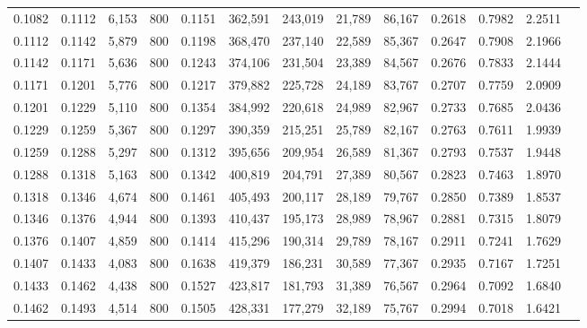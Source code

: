 \begin{tabular}{rrrrrrrrrrrrr}
0.1082 & 0.1112 &  6,153 &   800 &                                     0.1151 & 362,591 & 243,019 &  21,789 &  86,167 & 0.2618 & 0.7982 & 2.2511 \\
0.1112 & 0.1142 &  5,879 &   800 &                                     0.1198 & 368,470 & 237,140 &  22,589 &  85,367 & 0.2647 & 0.7908 & 2.1966 \\
0.1142 & 0.1171 &  5,636 &   800 &                                     0.1243 & 374,106 & 231,504 &  23,389 &  84,567 & 0.2676 & 0.7833 & 2.1444 \\
0.1171 & 0.1201 &  5,776 &   800 &                                     0.1217 & 379,882 & 225,728 &  24,189 &  83,767 & 0.2707 & 0.7759 & 2.0909 \\
0.1201 & 0.1229 &  5,110 &   800 &                                     0.1354 & 384,992 & 220,618 &  24,989 &  82,967 & 0.2733 & 0.7685 & 2.0436 \\
0.1229 & 0.1259 &  5,367 &   800 &                                     0.1297 & 390,359 & 215,251 &  25,789 &  82,167 & 0.2763 & 0.7611 & 1.9939 \\
0.1259 & 0.1288 &  5,297 &   800 &                                     0.1312 & 395,656 & 209,954 &  26,589 &  81,367 & 0.2793 & 0.7537 & 1.9448 \\
0.1288 & 0.1318 &  5,163 &   800 &                                     0.1342 & 400,819 & 204,791 &  27,389 &  80,567 & 0.2823 & 0.7463 & 1.8970 \\
0.1318 & 0.1346 &  4,674 &   800 &                                     0.1461 & 405,493 & 200,117 &  28,189 &  79,767 & 0.2850 & 0.7389 & 1.8537 \\
0.1346 & 0.1376 &  4,944 &   800 &                                     0.1393 & 410,437 & 195,173 &  28,989 &  78,967 & 0.2881 & 0.7315 & 1.8079 \\
0.1376 & 0.1407 &  4,859 &   800 &                                     0.1414 & 415,296 & 190,314 &  29,789 &  78,167 & 0.2911 & 0.7241 & 1.7629 \\
0.1407 & 0.1433 &  4,083 &   800 &                                     0.1638 & 419,379 & 186,231 &  30,589 &  77,367 & 0.2935 & 0.7167 & 1.7251 \\
0.1433 & 0.1462 &  4,438 &   800 &                                     0.1527 & 423,817 & 181,793 &  31,389 &  76,567 & 0.2964 & 0.7092 & 1.6840 \\
0.1462 & 0.1493 &  4,514 &   800 &                                     0.1505 & 428,331 & 177,279 &  32,189 &  75,767 & 0.2994 & 0.7018 & 1.6421 \\

\end{tabular}
